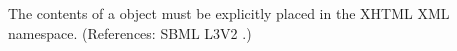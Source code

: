 The contents of a \Notes object must be explicitly placed in the
XHTML XML namespace.  (References: SBML L3V2 .)
